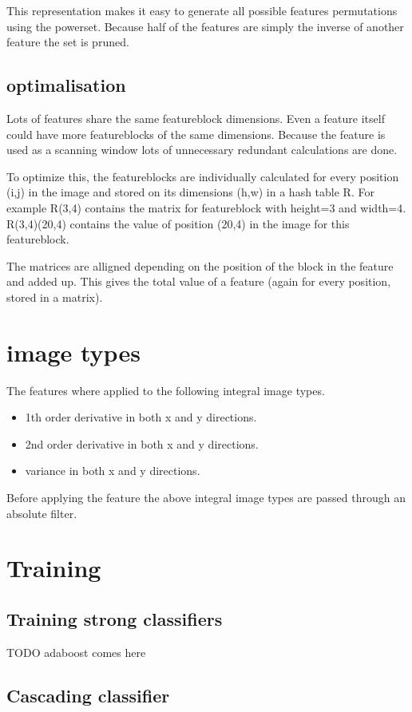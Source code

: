 \documentclass[a4paper,11pt]{article}
\begin{document}
	This representation makes it easy to generate all possible features
	permutations using the powerset.  Because half of the features are simply
	the inverse of another feature the set is pruned.

	\subsection{optimalisation}
	Lots of features share the same featureblock dimensions. Even a feature
	itself could have more featureblocks of the same dimensions.  Because the
	feature is used as a scanning window lots of unnecessary redundant
	calculations are done.

	To optimize this, the featureblocks are individually calculated for every
	position (i,j) in the image and stored on its dimensions (h,w) in a hash
	table R.  For example R(3,4) contains the matrix for featureblock with
	height=3 and width=4.  R(3,4)(20,4) contains the value of position (20,4) in
	the image for this featureblock.

	The matrices are alligned depending on the position of the block in the
	feature and added up. This gives the total value of a feature (again for
	every position, stored in a matrix).

	\section{image types}
	The features where applied to the following integral image types.
	\begin{itemize}
		\item{1th order derivative in both x and y directions.}
		\item{2nd order derivative in both x and y directions.}
		\item{variance in both x and y directions.}
	\end{itemize}
	Before applying the feature the above integral image types are passed through an absolute filter.


\section{Training}
	\subsection*{Training strong classifiers}
	TODO adaboost comes here

	\subsection{Cascading classifier}
\end{document}
